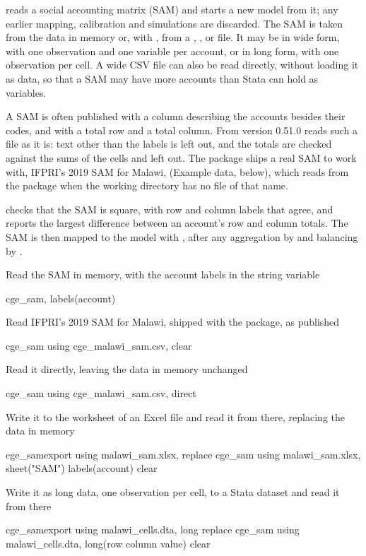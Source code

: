 

 reads a social accounting matrix (SAM) and starts a new model
from it; any earlier mapping, calibration and simulations are discarded. The
SAM is taken from the data in memory or, with , from a ,
,  or  file. It may be in wide form, with one
observation and one variable per account, or in long form, with one
observation per cell. A wide CSV file can also be read directly, without
loading it as data, so that a SAM may have more accounts than Stata can hold
as variables.

A SAM is often published with a column describing the accounts besides their
codes, and with a total row and a total column. From version 0.51.0
 reads such a file as it is: text other than the labels is left
out, and the totals are checked against the sums of the cells and left out.
The package ships a real SAM to work with, IFPRI's 2019 SAM for Malawi,
 (Example data, below), which  reads
from the package when the working directory has no file of that name.

 checks that the SAM is square, with row and column labels that
agree, and reports the largest difference between an account's row and column
totals. The SAM is then mapped to the model with , after any
aggregation by  and balancing by .


Read the SAM in memory, with the account labels in the string variable
\begin{stcode}
cge_sam, labels(account)
\end{stcode}
Read IFPRI's 2019 SAM for Malawi, shipped with the package, as published
\begin{stcode}
cge_sam using cge_malawi_sam.csv, clear
\end{stcode}
Read it directly, leaving the data in memory unchanged
\begin{stcode}
cge_sam using cge_malawi_sam.csv, direct
\end{stcode}
Write it to the worksheet  of an Excel file and read it from there,
replacing the data in memory
\begin{stcode}
cge_samexport using malawi_sam.xlsx, replace
cge_sam using malawi_sam.xlsx, sheet("SAM") labels(account) clear
\end{stcode}
Write it as long data, one observation per cell, to a Stata dataset and read
it from there
\begin{stcode}
cge_samexport using malawi_cells.dta, long replace
cge_sam using malawi_cells.dta, long(row column value) clear
\end{stcode}

